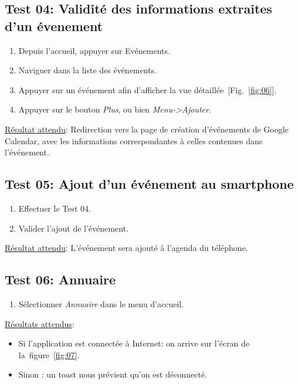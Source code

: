   \subsection{Test 04: Validité des informations extraites d'un évenement}
    \begin{enumerate}
    \item Depuis l'accueil, appuyer sur Evénements.
    \item Naviguer dans la liste des événements.
    \item Appuyer sur un événement afin d'afficher la vue détaillée~[Fig.~\ref{fig:06}].
    \item Appuyer sur le bouton \emph{Plus}, ou bien \emph{Menu->Ajouter}.
    \end{enumerate}

    \underline{Résultat attendu}: Redirection vers la page de création d'événements de Google Calendar, avec les informations correspondantes à celles contenues dans l'événement.

  \subsection{Test 05: Ajout d'un événement au smartphone}
    \begin{enumerate}
    \item Effectuer le Test 04.
    \item Valider l'ajout de l'événement.
    \end{enumerate}

    \underline{Résultat attendu}: L'événement sera ajouté à l'agenda du téléphone.


  \subsection{Test 06: Annuaire}
    \begin{enumerate}
    \item Sélectionner \emph{Annuaire} dans le menu d'accueil.
    \end{enumerate}

    \underline{Résultats attendus}:
    \begin{itemize}
    \item Si l'application est connectée à Internet: on arrive sur l'écran de la~figure~\ref{fig:07}.
    \item Sinon : un toast nous prévient qu'on est déconnecté.
    \end{itemize}


